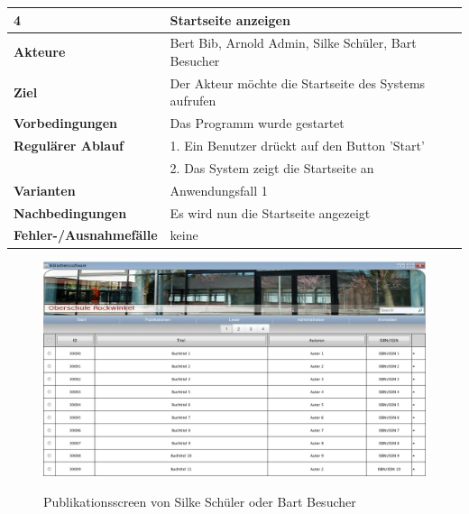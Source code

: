 \documentclass[fontsize=12pt,paper=a4,twoside]{scrartcl}
\begin{document}
\begin{table}[htbp]
\label{4}
\begin{tabular}{|l|p{10cm}|}
\hline 
\textbf{4} & \textbf{Startseite anzeigen} \\ \hline
\textbf{Akteure} & Bert Bib, Arnold Admin, Silke Schüler, Bart Besucher\\ \hline
\textbf{Ziel} & Der Akteur möchte die Startseite des Systems aufrufen  \\ \hline
\textbf{Vorbedingungen} & Das Programm wurde gestartet  \\ \hline
\textbf{Regulärer Ablauf} & 
1. Ein Benutzer drückt auf den Button 'Start' \\
&2. Das System zeigt die Startseite an\\
\hline
\textbf{Varianten} & 
Anwendungsfall 1 \\ \hline
\textbf{Nachbedingungen} & Es wird nun die Startseite angezeigt \\ \hline
\textbf{Fehler-/Ausnahmefälle} & keine\\
\hline
\end{tabular}
\end{table}

\begin{figure}[htbp]
\caption{Publikationsscreen von Silke Schüler oder Bart Besucher}
\includegraphics[width=1\textwidth]{WebApp-Screens/PublicationsscreenLogOut.png}
  \label{pub}
\end{figure}
\end{document}
